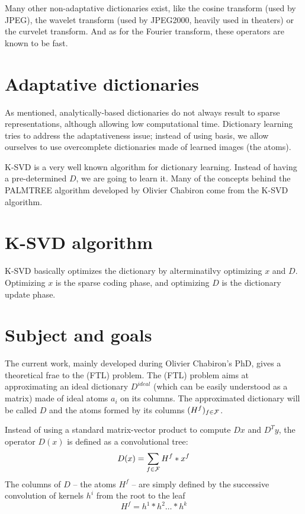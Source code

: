 Many other non-adaptative dictionaries exist, like the cosine transform (used by JPEG), the wavelet transform (used by JPEG2000, heavily used in theaters) or the curvelet transform. And as for the Fourier transform, these operators are known to be fast.

\section{Adaptative dictionaries}
As mentioned, analytically-based dictionaries do not always result to sparse representations, although allowing low computational time. Dictionary learning tries to address the adaptativeness issue; instead of using basis, we allow ourselves to use overcomplete dictionaries made of learned images (the atoms).

K-SVD is a very well known algorithm for dictionary learning. Instead of having a pre-determined $D$, we are going to learn it. Many of the concepts behind the PALMTREE algorithm developed by Olivier Chabiron come from the K-SVD algorithm.

\section{K-SVD algorithm}

K-SVD basically optimizes the dictionary by alterminatilvy optimizing $x$ and $D$. Optimizing $x$ is the sparse coding phase, and optimizing $D$ is the dictionary update phase.

\section{Subject and goals}

The current work, mainly developed during Olivier Chabiron's PhD, gives a theoretical frae to the (FTL) problem. The (FTL) problem aims at approximating an ideal dictionary $D^{ideal}$ (which can be easily understood as a matrix) made of ideal atoms $a_i$ on its columns. The approximated dictionary will be called $D$ and the atoms formed by its columns $(H^f)_{f \in \mathcal F}$. 

Instead of using a standard matrix-vector product to compute $Dx$ and $D^Ty$, the operator $D(x)$ is defined as a convolutional tree:
$$D(x) = \sum_{f\in\mathcal F} H^f * x^f$$
The columns of $D$ – the atoms $H^f$ – are simply defined by the successive convolution of kernels $h^i$ from the root to the leaf
$$H^f = h^1 * h^2 \dots * h^k$$

